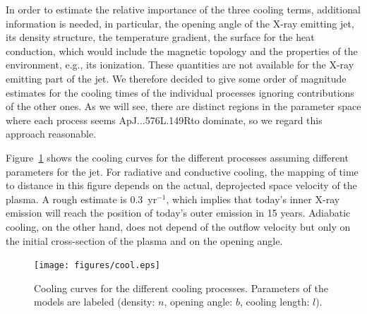 In order to estimate the relative importance of the three cooling terms, additional information is needed, in particular, the opening angle of the X-ray emitting jet, its density structure, the temperature gradient, the surface for the heat conduction, which would include the magnetic topology and the properties of the environment, e.g., its ionization. These quantities are not available for the X-ray emitting part of the jet. We therefore decided to give some order of magnitude estimates for the cooling times of the individual processes ignoring contributions of the other ones. As we will see, there are distinct regions in the parameter space where each process seems ApJ...576L.149Rto dominate, so we regard this approach reasonable.

Figure~\ref{fig:cooling} shows the cooling curves for the different processes assuming different parameters for the jet. For radiative and conductive cooling, the mapping of time to distance in this figure depends on the actual, deprojected space velocity of the plasma. 
A rough estimate is 0.3\arcsec{}~yr$^{-1}$, which implies that today's inner X-ray emission will reach the position of today's outer emission in 15 years.
Adiabatic cooling, on the other hand, does not depend of the outflow velocity but only on the initial cross-section of the plasma and on the opening angle.


\begin{figure}
  \centering
   \texttt{[image: figures/cool.eps]}
   \caption{Cooling curves for the different cooling processes. Parameters of the models are labeled (density: $n$, opening angle: $b$, cooling length: $l$). \label{fig:cooling}}
\end{figure}


